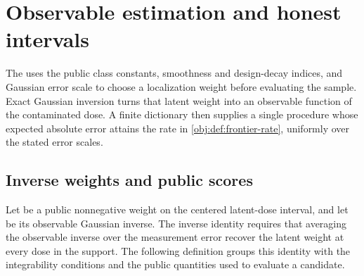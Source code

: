 \section{Observable estimation and honest intervals}

The  uses the public class constants, smoothness and design-decay indices, and Gaussian error scale to choose a localization weight before evaluating the sample. Exact Gaussian inversion turns that latent weight into an observable function of the contaminated dose. A finite dictionary then supplies a single procedure whose expected absolute error attains the rate in \cref{obj:def:frontier-rate}, uniformly over the stated error scales.

\subsection{Inverse weights and public scores}

Let  be a public nonnegative weight on the centered latent-dose interval, and let  be its observable Gaussian inverse. The inverse identity requires that averaging the observable inverse over the measurement error recover the latent weight at every dose in the support. The following definition groups this identity with the integrability conditions and the public quantities used to evaluate a candidate.

